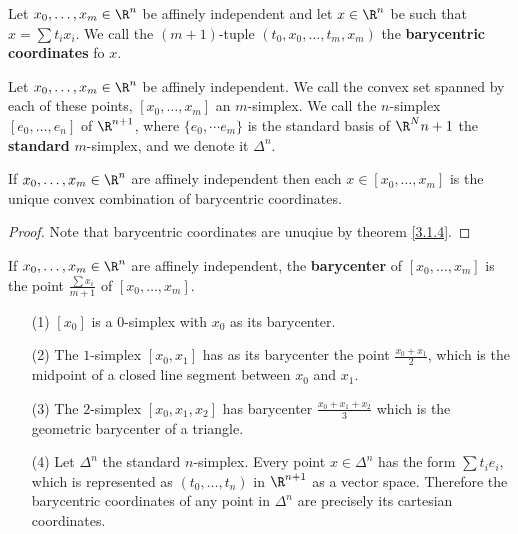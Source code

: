 \begin{definition}
    Let $x_0, \dots, x_m \in \R^n$ be affinely independent and let $x \in \R^n$
    be such that  $x=\sum{t_ix_i}$. We call the $(m+1)$-tuple $(t_0,x_0, \dots,
    t_m,x_m)$ the \textbf{barycentric coordinates} fo $x$.
\end{definition}

\begin{definition}
    Let $x_0, \dots, x_m \in \R^n$ be affinely independent. We call the convex
    set spanned by each of these points, $[x_0, \dots, x_m]$ an $m$-simplex. We
    call the  $n$-simplex $[e_0, \dots, e_n]$ of $\R^{n+1}$, where $\{e_0,
    \dotsm e_m\}$ is the standard basis of $\R^N{n+1}$ the \textbf{standard}
    $m$-simplex, and we denote it $\Delta^n$.
\end{definition}

\begin{theorem}\label{3.1.6}
    If $x_0, \dots, x_m \in \R^n$ are affinely independent then each $x \in
    [x_0, \dots, x_m]$ is the unique convex combination of barycentric
    coordinates.
\end{theorem}
\begin{proof}
    Note that barycentric coordinates are unuqiue by theorem \ref{3.1.4}.
\end{proof}

\begin{definition}
    If $x_0, \dots, x_m \in \R^n$ are affinely independent, the
    \textbf{barycenter} of $[x_0, \dots, x_m]$ is the point
    $\frac{\sum{x_i}}{m+1}$ of $[x_0, \dots, x_m]$.
\end{definition}

\begin{example}\label{}
    \begin{enumerate}
        \item[(1)] $[x_0]$ is a $0$-simplex with  $x_0$ as its barycenter.

        \item[(2)] The $1$-simplex  $[x_0,x_1]$ has as its barycenter the point
            $\frac{x_0+x_1}{2}$, which is the midpoint of a closed line segment
            between $x_0$ and $x_1$.

        \item[(3)] The $2$-simplex $[x_0,x_1,x_2]$ has barycenter
            $\frac{x_0+x_1+x_2}{3}$ which is the geometric barycenter of a
            triangle.

        \item[(4)] Let $\Delta^n$ the standard  $n$-simplex. Every point $x \in
            \Delta^n$ has the form $\sum{t_ie_i}$, which is represented as
            $(t_0, \dots, t_n)$ in $\R^{n+1}$ as a vector space. Therefore the
            barycentric coordinates of any point in $\Delta^n$ are precisely its
            cartesian coordinates.
    \end{enumerate}
\end{example}

